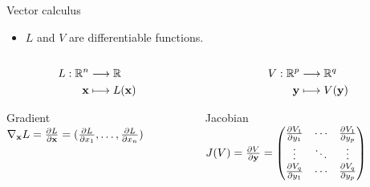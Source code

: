 \documentclass[xcolor=pdftex,dvipsnames,table,mathserif]{beamer}
\begin{document}
\begin{frame}{Vector calculus}

\begin{itemize}
\item $L$ and $V$ are differentiable functions.
\end{itemize}

  \begin{columns}
    \begin{column}{.5\textwidth}

      \begin{equation*}
    \begin{split}
      L: \mathbb{R}^n & \longrightarrow \mathbb{R}\\
      \mathbf{x}      & \longmapsto L(\mathbf{x})
    \end{split}
  \end{equation*}

  \begin{block}{Gradient}
        \centering
        $\nabla_{\mathbf{x}} L = \frac{\partial L}{\partial \mathbf{x}} = (\frac{\partial L}{\partial x_1}, \ldots, \frac{\partial L}{\partial x_n}) $
      \end{block}
    \end{column}

\pause

    \begin{column}{.5\textwidth}

      \begin{equation*}
    \begin{split}
      V: \mathbb{R}^p & \longrightarrow \mathbb{R}^q\\
      \mathbf{y}      & \longmapsto V(\mathbf{y})
    \end{split}
  \end{equation*}

  \begin{block}{Jacobian}
        \centering
        $J(V) = \frac{\partial V}{\partial \mathbf{y}} =
        \begin{pmatrix}
          \frac{\partial V_1}{\partial y_1} & \cdots & \frac{\partial V_1}{\partial y_p}  \\
          \vdots  & \ddots & \vdots  \\
          \frac{\partial V_q}{\partial y_1} & \cdots & \frac{\partial V_q}{\partial y_p}
        \end{pmatrix}
        $
      \end{block}
    \end{column}
  \end{columns}

\end{frame}
\end{document}
